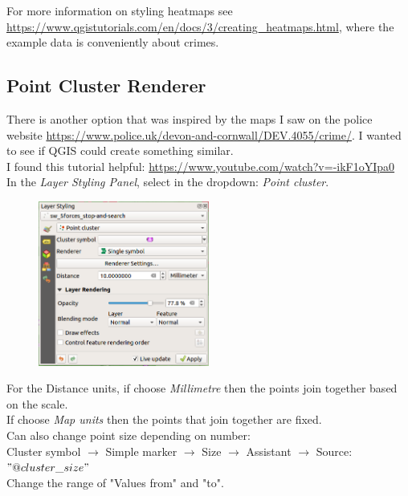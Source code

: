 For more information on styling heatmaps see \url{https://www.qgistutorials.com/en/docs/3/creating_heatmaps.html}, where the example data is conveniently about crimes.

\subsection{Point Cluster Renderer}

There is another option that was inspired by the maps I saw on the police website \url{https://www.police.uk/devon-and-cornwall/DEV.4055/crime/}. I wanted to see if QGIS could create something similar.\\

I found this tutorial helpful: \url{https://www.youtube.com/watch?v=-ikF1oYIpa0}\\

In the \textit{Layer Styling Panel}, select in the dropdown: \textit{Point cluster}.

\begin{figure}[!h]
	\centering
	\includegraphics[width=0.5\textwidth]{images/point_cluster_layer_styling_panel.png}
	\caption{}
	\label{ft_fig_firstfig3}
\end{figure}

For the Distance units, if choose \textit{Millimetre} then the points join together based on the scale.\\
If choose \textit{Map units} then the points that join together are fixed.\\

Can also change point size depending on number:\\
Cluster symbol $\rightarrow$ Simple marker $\rightarrow$ Size $\rightarrow$ Assistant $\rightarrow$ Source: $"@cluster\_size"$\\

Change the range of "Values from" and "to".\\

